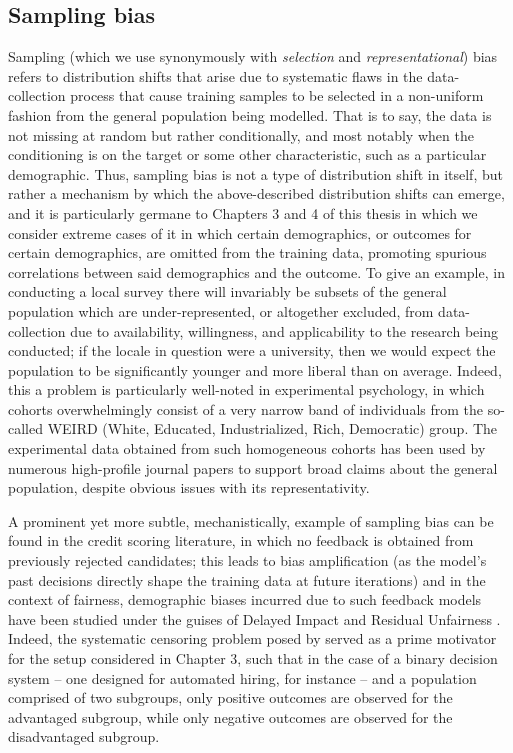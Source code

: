 \subsection{Sampling bias}\label{ssec:sampling-bias}
Sampling (which we use synonymously with \emph{selection} and \emph{representational}) bias refers
to distribution shifts that arise due to systematic flaws in the data-collection process that cause
training samples to be selected in a non-uniform fashion from the general population being
modelled.
%
That is to say, the data is not missing at random but rather conditionally, and most notably when
the conditioning is on the target or some other characteristic, such as a particular demographic.
%
Thus, sampling bias is not a type of distribution shift in itself, but rather a mechanism by which the
above-described distribution shifts can emerge, and it is particularly germane to Chapters 3 and 4
of this thesis in which we consider extreme cases of it in which certain demographics, or outcomes
for certain demographics, are omitted from the training data, promoting spurious correlations
between said demographics and the outcome.
%
To give an example, in conducting a local survey there will invariably be subsets of the general
population which are under-represented, or altogether excluded, from data-collection due to
availability, willingness, and applicability to the research being conducted; if the locale in
question were a university, then we would expect the population to be significantly younger and
more liberal than on average.
%
Indeed, this a problem is particularly well-noted in experimental psychology, in which cohorts
overwhelmingly consist of a very narrow band of individuals from the so-called WEIRD (White,
Educated, Industrialized, Rich, Democratic)\citep{henrich2010weirdest} group.
%
The experimental data obtained from such homogeneous cohorts has been used by numerous high-profile
journal papers to support broad claims about the general population, despite obvious issues with
its representativity.

%
A prominent yet more subtle, mechanistically, example of sampling bias can be found in the credit
scoring literature, in which no feedback is obtained from previously rejected candidates; this
leads to bias amplification (as the model's past decisions directly shape the training data at
future iterations) and in the context of fairness, demographic biases incurred due to such feedback
models have been studied under the guises of Delayed Impact \citep{liu2018delayed} and Residual
Unfairness \citep{kallus2018residual}.
%
Indeed, the systematic censoring problem posed by \cite{kallus2018residual} served as a prime
motivator for the setup considered in Chapter 3, such that in the case of a binary decision system
-- one designed for automated hiring, for instance -- and a population comprised of two subgroups,
only positive outcomes are observed for the advantaged subgroup, while only negative outcomes are
observed for the disadvantaged subgroup.
%
